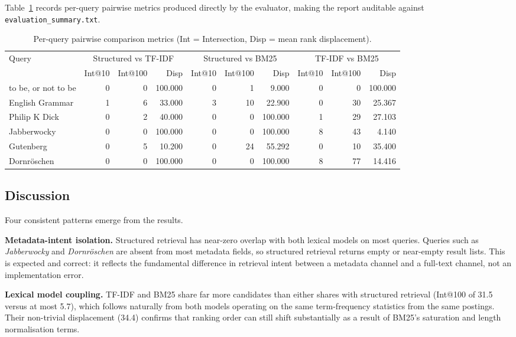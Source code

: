 \documentclass[sigconf]{acmart}
\begin{document}
Table~\ref{tab:perquery} records per-query pairwise metrics produced directly by the evaluator, making the report auditable against \texttt{evaluation\_summary.txt}.

\begin{table}[t]
\caption{Per-query pairwise comparison metrics (Int = Intersection, Disp = mean rank displacement).}
\label{tab:perquery}
\centering
\begin{tabular}{lrrrrrrrrr}
\toprule
Query & \multicolumn{3}{c}{Structured vs TF-IDF} & \multicolumn{3}{c}{Structured vs BM25} & \multicolumn{3}{c}{TF-IDF vs BM25} \\
\cmidrule(lr){2-4}\cmidrule(lr){5-7}\cmidrule(lr){8-10}
 & Int@10 & Int@100 & Disp & Int@10 & Int@100 & Disp & Int@10 & Int@100 & Disp \\
\midrule
to be, or not to be & 0 & 0  & 100.000 & 0 & 1  & 9.000   & 0 & 0  & 100.000 \\
English Grammar     & 1 & 6  & 33.000  & 3 & 10 & 22.900  & 0 & 30 & 25.367  \\
Philip K Dick       & 0 & 2  & 40.000  & 0 & 0  & 100.000 & 1 & 29 & 27.103  \\
Jabberwocky         & 0 & 0  & 100.000 & 0 & 0  & 100.000 & 8 & 43 & 4.140   \\
Gutenberg           & 0 & 5  & 10.200  & 0 & 24 & 55.292  & 0 & 10 & 35.400  \\
Dornr\"{o}schen     & 0 & 0  & 100.000 & 0 & 0  & 100.000 & 8 & 77 & 14.416  \\
\bottomrule
\end{tabular}
\end{table}

\subsection{Discussion}

Four consistent patterns emerge from the results.

\textbf{Metadata-intent isolation.} Structured retrieval has near-zero overlap with both lexical models on most queries. Queries such as \emph{Jabberwocky} and \emph{Dornr\"{o}schen} are absent from most metadata fields, so structured retrieval returns empty or near-empty result lists. This is expected and correct: it reflects the fundamental difference in retrieval intent between a metadata channel and a full-text channel, not an implementation error.

\textbf{Lexical model coupling.} TF-IDF and BM25 share far more candidates than either shares with structured retrieval (Int@100 of 31.5 versus at most 5.7), which follows naturally from both models operating on the same term-frequency statistics from the same postings. Their non-trivial displacement (34.4) confirms that ranking order can still shift substantially as a result of BM25's saturation and length normalisation terms.
\end{document}
